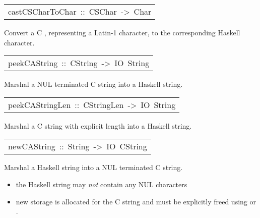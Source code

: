 \begin{haddockdesc}
\item[\begin{tabular}{@{}l}
castCSCharToChar\ ::\ CSChar\ ->\ Char
\end{tabular}]\haddockbegindoc
Convert a C , representing a Latin-1 character, to the
 corresponding Haskell character.
\par

\end{haddockdesc}
\begin{haddockdesc}
\item[\begin{tabular}{@{}l}
peekCAString\ ::\ CString\ ->\ IO\ String
\end{tabular}]\haddockbegindoc
Marshal a NUL terminated C string into a Haskell string.
\par

\end{haddockdesc}
\begin{haddockdesc}
\item[\begin{tabular}{@{}l}
peekCAStringLen\ ::\ CStringLen\ ->\ IO\ String
\end{tabular}]\haddockbegindoc
Marshal a C string with explicit length into a Haskell string.
\par

\end{haddockdesc}
\begin{haddockdesc}
\item[\begin{tabular}{@{}l}
newCAString\ ::\ String\ ->\ IO\ CString
\end{tabular}]\haddockbegindoc
Marshal a Haskell string into a NUL terminated C string.
\par
\begin{itemize}
\item
 the Haskell string may \emph{not} contain any NUL characters
\par

\item
 new storage is allocated for the C string and must be
   explicitly freed using  or
   .
\par

\end{itemize}

\end{haddockdesc}
